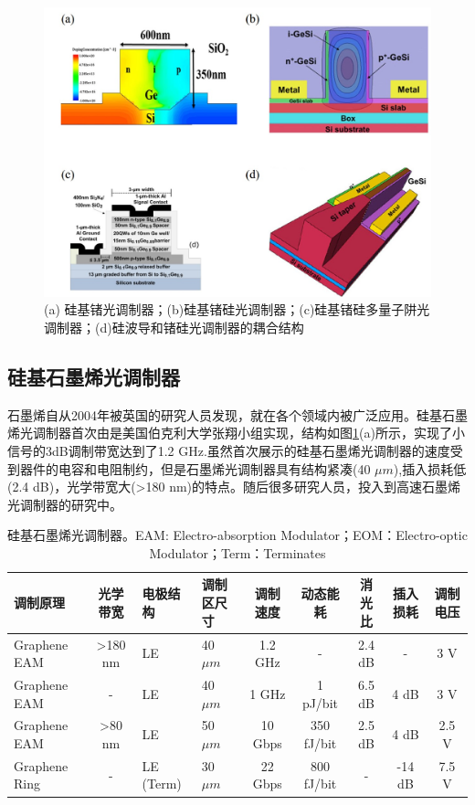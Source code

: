\begin{figure}[htb]
	\centering
	\includegraphics[width=12cm]{./Pictures/fig_ge_mod.jpg}
	\caption{ (a) 硅基锗光调制器\cite{Srinivasan201656}；(b)硅基锗硅光调制器\cite{Dazeng2013high}；(c)硅基锗硅多量子阱光调制器\cite{chaisakul201223}；(d)硅波导和锗硅光调制器的耦合结构\cite{Dazeng2013high}}
	\label{fig_ge_mod}
\end{figure}
\subsection{硅基石墨烯光调制器}
石墨烯自从2004年被英国的研究人员发现\cite{novoselov2004electric}，就在各个领域内被广泛应用。硅基石墨烯光调制器首次由是美国伯克利大学张翔小组实现，结构如图\ref{sil_graphene_mod}(a)所示，实现了小信号的3dB调制带宽达到了1.2 GHz.虽然首次展示的硅基石墨烯光调制器的速度受到器件的电容和电阻制约，但是石墨烯光调制器具有结构紧凑(40 $\mu m$),插入损耗低(2.4 dB)，光学带宽大(>180 nm)的特点。随后很多研究人员，投入到高速石墨烯光调制器的研究中。
{
	\begin{table}[htb]
		\caption{硅基石墨烯光调制器。EAM: Electro-absorption Modulator；EOM：Electro-optic Modulator；Term：Terminates}
		\label{sil_graphene_mod}
		\centering
		\begin{tabular}[t]{p{1.5cm}cp{0.8cm}p{1.2cm}ccccc}
			\hline
			调制原理 & 光学带宽 & 电极结构 & 调制区尺寸 & 调制速度 & 动态能耗 & 消光比 & 插入损耗 & 调制电压\\
			\hline
			Graphene EAM\cite{liu2011graphene} & >180 nm & LE  & 40 $\mu m$ & 1.2 GHz & - & 2.4 dB & - & 3 V\\
			Graphene EAM\cite{liu2012double} & -  & LE  & 40 $\mu m$ & 1 GHz & 1 pJ/bit & 6.5 dB & 4 dB & 3 V\\
			Graphene EAM\cite{hu2014broadband} & >80 nm & LE  & 50 $\mu m$ & 10 Gbps & 350 fJ/bit & 2.5 dB & 4 dB& 2.5 V\\
			Graphene Ring\cite{phare2015graphene} & - & LE (Term) & 30 $\mu m$ & 22 Gbps & 800 fJ/bit & - & -14 dB & 7.5 V\\
			\hline
		\end{tabular}
	\end{table}
}

